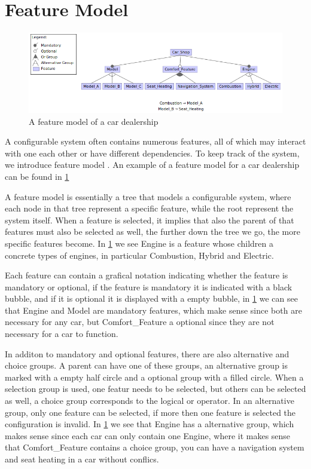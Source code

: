 \section{Feature Model}\label{ch:Feature Model}

\begin{figure}[h]
    \centering
    \includegraphics[scale=0.6]{gfx/Car_Shop.png}
    \caption{A feature model of a car dealership}
    \label{fig:car}
\end{figure}

A configurable system often contains numerous features, all of which may interact with one each other or have different dependencies.
To keep track of the system, we introduce feature model \cite{Feature-Oriented-Software-Product-Lines-Feature-models}. An example
of a feature model for a car dealership can be found in \ref{fig:car}

A feature model is essentially a tree that models a configurable system, where each node in that tree represent a specific feature, while the root
represent the system itself. When a feature is selected, it implies that also the parent of that features must also be selected as well, the further
down the tree we go, the more specific features become. In \ref{fig:car} we see Engine is a feature whose children a concrete types
of engines, in particular Combustion, Hybrid and Electric.

Each feature can contain a grafical notation indicating whether the feature is mandatory or optional, if the feature is mandatory it is 
indicated with a black bubble, and if it is optional it is displayed with a empty bubble, in \ref{fig:car} we can see that Engine and
Model are mandatory features, which make sense since both are necessary for any car, but Comfort\_Feature a optional since they are not
necessary for a car to function.

In additon to mandatory and optional features, there are also alternative and choice groups. A parent can have one of these groups, an alternative group
is marked with a empty half circle and a optional group with a filled circle. When a selection group is used, one featur needs to be selected, but
others can be selected as well, a choice group corresponds to the logical or operator. In an alternative group, only one feature can be
selected, if more then one feature is selected the configuration is invalid. In \ref{fig:car} we see that Engine has a alternative group, which makes sense
since each car can only contain one Engine, where it makes sense that Comfort\_Feature contains a choice group, you can have a navigation system
and seat heating in a car without conflics.

